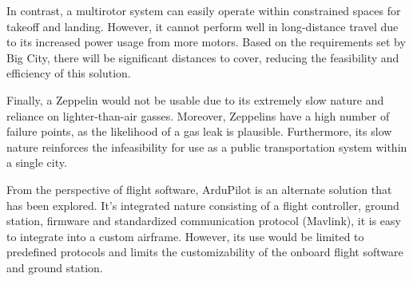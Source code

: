 In contrast, a multirotor system can easily operate within constrained spaces
for takeoff and landing. However, it cannot perform well in long-distance
travel due to its increased power usage from more motors. Based on the
requirements set by Big City, there will be significant distances to cover,
reducing the feasibility and efficiency of this solution.

Finally, a Zeppelin would not be usable due to its extremely slow nature and
reliance on lighter-than-air gasses. Moreover, Zeppelins have a high number of
failure points, as the likelihood of a gas leak is plausible. Furthermore, its
slow nature reinforces the infeasibility for use as a public transportation
system within a single city.

From the perspective of flight software, ArduPilot is an alternate solution
that has been explored. It's integrated nature consisting of a flight
controller, ground station, firmware and standardized communication protocol
(Mavlink), it is easy to integrate into a custom airframe. However, its use
would be limited to predefined protocols and limits the customizability of the
onboard flight software and ground station.
